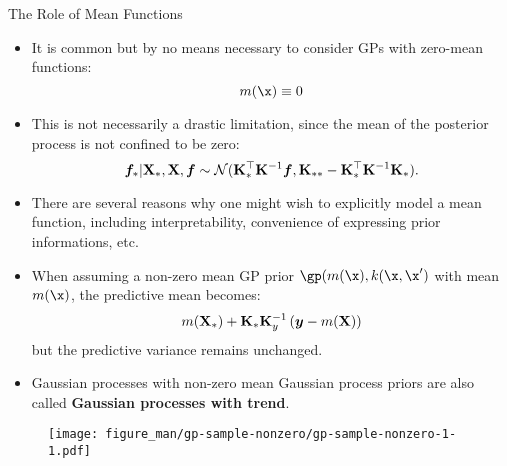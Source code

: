 \begin{frame}[c,allowframebreaks]{The Role of Mean Functions}

\begin{itemize}
\item It is common but by no means necessary to consider GPs with zero-mean functions: $$m(\x) \equiv 0$$

\vspace{3mm}
\item This is not necessarily a drastic limitation, since the mean of the posterior process is not confined to be zero:
\vspace{-3mm}
  $$\bm{f}_* | \mathbf{X}_*, \mathbf{X}, \bm{f} \sim \mathcal{N}(\mathbf{K}_{*}^\top\mathbf{K}^{-1}\bm{f}, \mathbf{K}_{**} - \mathbf{K}_*^\top \mathbf{K} ^{-1}\mathbf{K}_*).$$
  
\vspace{3mm}
\item There are several reasons why one might wish to explicitly model a mean function, including interpretability, convenience of expressing prior informations, etc.


\framebreak

\item When assuming a non-zero mean GP prior $\gp (m(\x), k(\x, \x^\prime)$ with mean $m(\x)$, the predictive mean becomes:\vspace{-5mm}$$m(\mathbf{X}_*) + \mathbf{K}_*\mathbf{K}_y^{-1}\left(\bm{y} - m(\mathbf{X})\right)$$\vspace{-7mm}but the predictive variance remains unchanged. 

\vspace{20mm}
\item Gaussian processes with non-zero mean Gaussian process priors are also called \textbf{Gaussian processes with trend}.  

\end{itemize}

\framebreak


\begin{figure}
\texttt{[image: figure\_man/gp-sample-nonzero/gp-sample-nonzero-1-1.pdf]}
\end{figure}

\framebreak


\end{frame}
